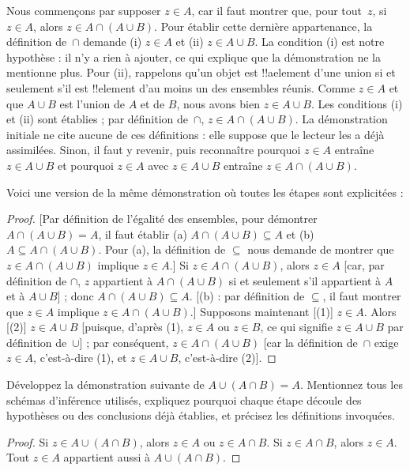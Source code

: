 \documentclass[../../../include/open-logic-section]{subfiles}
\begin{document}
Nous commençons par supposer
$z \in A$, car il faut montrer
que, pour tout~$z$, si
$z \in A$, alors
$z \in A \cap (A \cup B)$.
Pour établir cette dernière
appartenance, la définition
de~$\cap$ demande
(i) $z \in A$ et
(ii) $z \in A \cup B$.
La condition (i) est notre
hypothèse : il n'y a rien
à ajouter, ce qui explique
que la démonstration ne la
mentionne plus. Pour (ii),
rappelons qu'un objet est
!!a{element} d'une union
si et seulement s'il est
!!{element} d'au moins un
des ensembles réunis.
Comme $z \in A$ et que
$A \cup B$ est l'union
de $A$ et de $B$, nous
avons bien $z \in A \cup B$.
Les conditions (i) et (ii)
sont établies ; par définition
de~$\cap$,
$z \in A \cap (A \cup B)$.
La démonstration initiale
ne cite aucune de ces
définitions : elle suppose
que le lecteur les a déjà
assimilées. Sinon, il faut
y revenir, puis reconnaître
pourquoi $z \in A$ entraîne
$z \in A \cup B$ et pourquoi
$z \in A$ avec
$z \in A \cup B$ entraîne
$z \in A \cap (A \cup B)$.

Voici une version de la même
démonstration où toutes les
étapes sont explicitées :
\begin{proof}{}
[Par définition de l'égalité des
ensembles, pour démontrer
$A \cap (A \cup B) = A$,
il faut établir
(a) $A \cap (A \cup B) \subseteq A$
et
(b) $A \subseteq A \cap (A \cup B)$.
Pour (a), la définition de
$\subseteq$ nous demande
de montrer que
$z \in A \cap (A \cup B)$
implique $z \in A$.]
Si $z \in A \cap (A \cup B)$,
alors $z \in A$
[car, par définition de
$\cap$, $z$ appartient à
$A \cap (A \cup B)$
si et seulement s'il
appartient à $A$ et
à $A \cup B$] ;
donc
$A \cap (A \cup B) \subseteq A$.
[(b) : par définition de
$\subseteq$, il faut
montrer que $z \in A$
implique
$z \in A \cap (A \cup B)$.]
Supposons maintenant
[(1)] $z \in A$.
Alors
[(2)] $z \in A \cup B$
[puisque, d'après (1),
$z \in A$ ou $z \in B$,
ce qui signifie
$z \in A \cup B$
par définition de~$\cup$] ;
par conséquent,
$z \in A \cap (A \cup B)$
[car la définition
de~$\cap$ exige
$z \in A$, c'est-à-dire
(1), et
$z \in A \cup B$,
c'est-à-dire (2)].
\end{proof}

\begin{prob}
Développez la démonstration
suivante de
$A \cup (A \cap B) = A$.
Mentionnez tous les schémas
d'inférence utilisés,
expliquez pourquoi chaque
étape découle des hypothèses
ou des conclusions déjà
établies, et précisez
les définitions invoquées.
\begin{proof}
  Si $z \in A \cup (A \cap B)$,
  alors $z \in A$ ou
  $z \in A \cap B$.
  Si $z \in A \cap B$,
  alors $z \in A$.
  Tout $z \in A$ appartient
  aussi à $A \cup (A \cap B)$.
\end{proof}
\end{prob}
\end{document}
